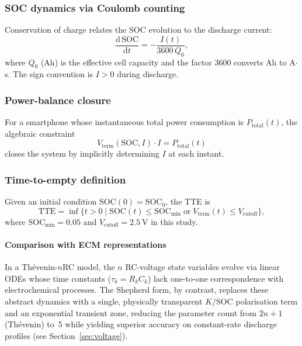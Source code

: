 \documentclass[5p,times,number]{elsarticle}
\newcommand{\secref}[1]{\hyperref[#1]{\textup{Section~\ref*{#1}}}}
\def\secref#1{Section~\ref{#1}}
\begin{document}
\subsubsection{SOC dynamics via Coulomb counting}
Conservation of charge relates the SOC evolution to the discharge current:
\begin{equation}\label{eq:coulomb}
\frac{\mathrm{d}\,\mathrm{SOC}}{\mathrm{d}t} = -\frac{I(t)}{3600\,Q_0},
\end{equation}
where $Q_0$ (Ah) is the effective cell capacity and the factor 3600 converts Ah to A$\cdot$s.  The sign convention is $I>0$ during discharge.

\subsubsection{Power-balance closure}
For a smartphone whose instantaneous total power consumption is $P_{\mathrm{total}}(t)$, the algebraic constraint
\begin{equation}\label{eq:power}
V_{\mathrm{term}}(\mathrm{SOC}, I) \cdot I = P_{\mathrm{total}}(t)
\end{equation}
closes the system by implicitly determining $I$ at each instant.

\subsubsection{Time-to-empty definition}
Given an initial condition $\mathrm{SOC}(0) = \mathrm{SOC}_0$, the TTE is
\begin{equation}\label{eq:tte}
\mathrm{TTE} = \inf\bigl\{t > 0 \;\big|\; \mathrm{SOC}(t) \le \mathrm{SOC}_{\min} \;\text{or}\; V_{\mathrm{term}}(t) \le V_{\mathrm{cutoff}}\bigr\},
\end{equation}
where $\mathrm{SOC}_{\min} = 0.05$ and $V_{\mathrm{cutoff}} = \SI{2.5}{\volt}$ in this study.

\paragraph{Comparison with ECM representations}
In a Th\'{e}venin-$n$RC model, the $n$ RC-voltage state variables evolve via linear ODEs whose time constants ($\tau_k = R_k C_k$) lack one-to-one correspondence with electrochemical processes.
The Shepherd form, by contrast, replaces these abstract dynamics with a single, physically transparent $K/\mathrm{SOC}$ polarisation term and an exponential transient zone, reducing the parameter count from $2n+1$ (Th\'{e}venin) to~5 while yielding superior accuracy on constant-rate discharge profiles (see \secref{sec:voltage}).
\end{document}
